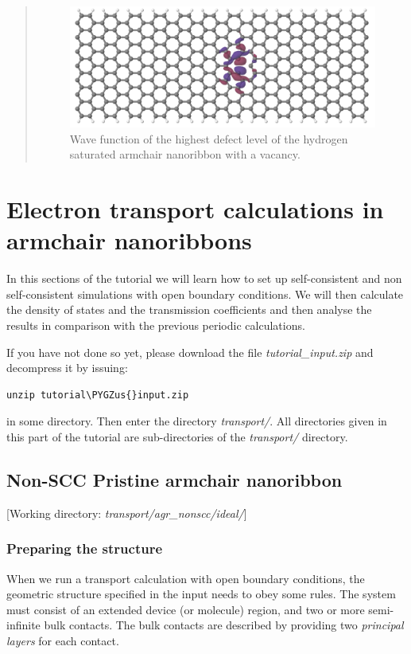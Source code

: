\documentclass[a4paper,11pt,english]{sphinxmanual}
\def\PYGZus{\char`\_}
\begin{document}
{{\begin{quote}
\vskip -0.2cm
\begin{figure}[htbp]
\centering
\capstart
\includegraphics[width=0.650\linewidth]{armchair-v2-def3.png}
\caption{Wave function of the highest defect level of the hydrogen
saturated armchair nanoribbon with a vacancy.}\label{electstruct:fig-armchair-v2-def3}
\end{figure}
\end{quote}


\chapter{Electron transport calculations in armchair nanoribbons}
\label{transport::doc}\label{transport:electron-transport-calculations-in-armchair-nanoribbons}
In this sections of the tutorial we will learn how to set up self-consistent and non self-consistent simulations with open boundary conditions. We will then
calculate the density of states and the transmission coefficients and then
analyse the results in comparison with the previous periodic
calculations.

If you have not done so yet, please download the file
\emph{tutorial\_input.zip} and decompress it by issuing:

\begin{Verbatim}[commandchars=\\\{\}]
unzip tutorial\PYGZus{}input.zip
\end{Verbatim}

in some directory. Then enter the directory \emph{transport/}. All
directories given in this part of the tutorial are sub-directories of
the \emph{transport/} directory.


\section{Non-SCC Pristine armchair nanoribbon}
\label{transport:non-scc-pristine-armchair-nanoribbon}
{[}Working directory: \emph{transport/agr\_nonscc/ideal/}{]}


\subsection{Preparing the structure}
\label{transport:preparing-the-structure}
When we run a transport calculation with open boundary conditions, the
geometric structure specified in the input needs to obey some
rules. The system must consist of an extended device (or molecule)
region, and two or more semi-infinite bulk contacts. The bulk contacts
are described by providing two \emph{principal layers} for each contact.

}}
\end{document}
